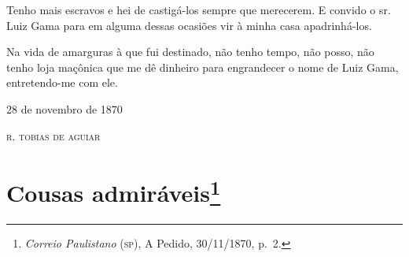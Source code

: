 {Tenho mais escravos e hei de castigá-los sempre que merecerem. E convido
o sr. Luiz Gama para em alguma dessas ocasiões vir à minha casa
apadrinhá-los.

Na vida de amarguras à que fui destinado, não tenho tempo, não posso,
não tenho loja maçônica que me dê dinheiro para engrandecer o nome de
Luiz Gama, entretendo-me com ele.

\begin{flushright}
28 de novembro de 1870

\textsc{r. tobias de aguiar}
\end{flushright}

\chapter{Cousas admiráveis\footnote{\emph{Correio Paulistano} (\textsc{sp}), A Pedido, 30/11/1870,
  p.~2.}} %

}

